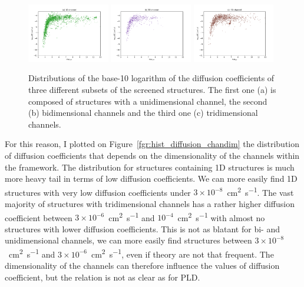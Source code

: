 \documentclass[main]{subfiles}
\begin{document}
\begin{figure}[ht]
  \centering
    \includegraphics[width=0.32\textwidth]{figures/5-diffusion/D_log-PLD_1D_chan.pdf}
    \includegraphics[width=0.32\textwidth]{figures/5-diffusion/D_log-PLD_2D_chan.pdf}
    \includegraphics[width=0.32\textwidth]{figures/5-diffusion/D_log-PLD_3D_chan.pdf}
    \caption{ Distributions of the base-10 logarithm of the diffusion coefficients of three different subsets of the screened structures. The first one (a) is composed of structures with a unidimensional channel, the second (b) bidimensional channels and the third one (c) tridimensional channels. }\label{fgr:scatter_diffusion_chandim}
\end{figure}

For this reason, I plotted on Figure~\ref{fgr:hist_diffusion_chandim} the distribution of diffusion coefficients that depends on the dimensionality of the channels within the framework. The distribution for structures containing 1D structures is much more heavy tail in terms of low diffusion coefficients. We can more easily find 1D structures with very low diffusion coefficients under $3\times 10^{-8}$~\si{\square\cm\per\s}. The vast majority of structures with tridimensional channels has a rather higher diffusion coefficient between $3\times 10^{-6}$~\si{\square\cm\per\s} and $10^{-4}$~\si{\square\cm\per\s} with almost no structures with lower diffusion coefficients. This is not as blatant for bi- and unidimensional channels, we can more easily find structures between $3\times 10^{-8}$~\si{\square\cm\per\s} and $3\times 10^{-6}$~\si{\square\cm\per\s}, even if theory are not that frequent. The dimensionality of the channels can therefore influence the values of diffusion coefficient, but the relation is not as clear as for PLD.
\end{document}
